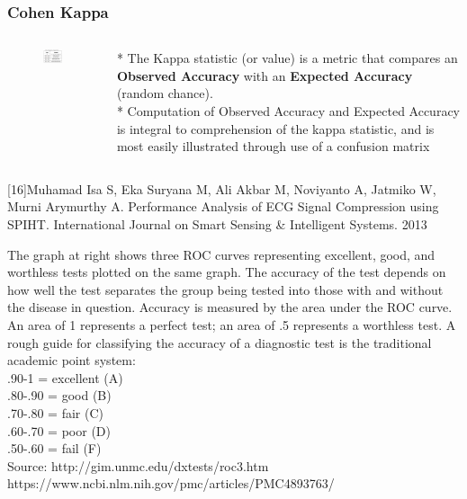\documentclass{beamer}
\begin{document}
\begin{frame}
\frametitle{Cohen Kappa }

\begin{columns}
	\begin{column}{.55\textwidth}
		\begin{figure}
		\includegraphics[width=55mm]{kappa_table.png}
	\end{figure}
	
	\end{column}
\begin{column}{.55\textwidth}
	
	
	* The Kappa statistic (or value) is a metric that compares an \textbf{Observed Accuracy} with an\textbf{ Expected Accuracy }(random chance). \\ * Computation of Observed Accuracy and Expected Accuracy is integral to comprehension of the kappa statistic, and is most easily illustrated through use of a confusion matrix
	
	
\end{column}

\end{columns}


 \begin{thebibliography}{01}
	{\tiny {} [16]Muhamad Isa S, Eka Suryana M, Ali Akbar M, Noviyanto A, Jatmiko W, Murni Arymurthy A. Performance Analysis of ECG Signal Compression using SPIHT. International Journal on Smart Sensing \& Intelligent Systems. 2013}
\end{thebibliography}


\end{frame}
\begin{frame}
The graph at right shows three ROC curves representing excellent, good, and worthless tests plotted on the same graph. The accuracy of the test depends on how well the test separates the group being tested into those with and without the disease in question. Accuracy is measured by the area under the ROC curve. An area of 1 represents a perfect test; an area of .5 represents a worthless test. A rough guide for classifying the accuracy of a diagnostic test is the traditional academic point system:\\

.90-1 = excellent (A)\\
.80-.90 = good (B)\\
.70-.80 = fair (C)\\
.60-.70 = poor (D)\\
.50-.60 = fail (F) \\


{\tiny Source: http://gim.unmc.edu/dxtests/roc3.htm} \\
{\tiny https://www.ncbi.nlm.nih.gov/pmc/articles/PMC4893763/}
\end{frame}
\end{document}
